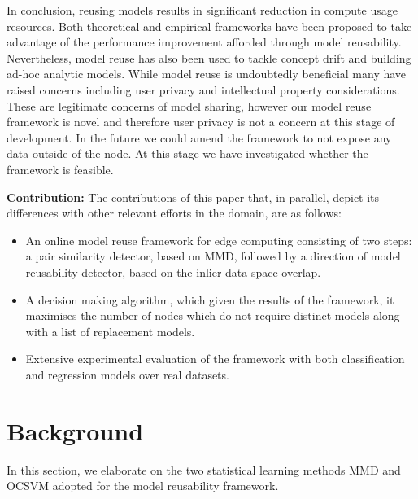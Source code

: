 \documentclass{mpaper}
\begin{document}
In conclusion, reusing models results in significant reduction in compute usage resources. Both theoretical and empirical frameworks have been proposed to take advantage of the performance improvement afforded through model reusability. Nevertheless, model reuse has also been used to tackle concept drift and building ad-hoc analytic models. While model reuse is undoubtedly beneficial many have raised concerns including user privacy and intellectual property considerations. These are legitimate concerns of model sharing, however our model reuse  framework is novel and therefore user privacy is not a concern at this stage of development. In the future we could amend the framework to not expose any data outside of the node. At this stage we have investigated whether the framework is feasible. 

\textbf{Contribution:} The contributions of this paper that, in parallel, depict its differences with other relevant efforts in the domain, are as follows:
\begin{itemize}
    \item An online model reuse framework for edge computing consisting of two steps: a pair similarity detector, based on MMD, followed by a direction of model reusability detector, based on the inlier data space overlap. 
    \item A decision making algorithm, which given the results of the framework, it maximises the number of nodes which do not require distinct models along with a list of replacement models.
    \item Extensive experimental evaluation of the framework with both classification and regression models over real datasets.
\end{itemize}

\section{Background}
In this section, we elaborate on the two statistical learning methods MMD and OCSVM adopted for the model reusability framework.
\end{document}
